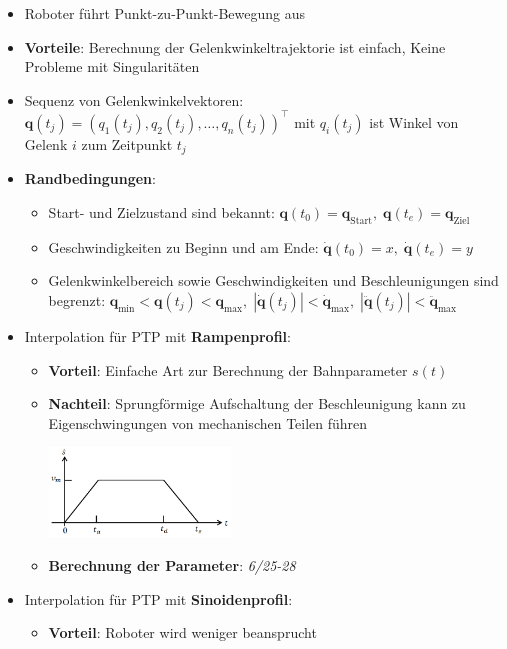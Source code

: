 \begin{itemize}
	\item Roboter führt Punkt-zu-Punkt-Bewegung aus
	\item \textbf{Vorteile}: Berechnung der Gelenkwinkeltrajektorie ist einfach, Keine Probleme mit Singularitäten
	\item Sequenz von Gelenkwinkelvektoren: $\mathbf{q}(t_j)=(q_1(t_j),q_2(t_j),\ldots, q_n(t_j))^\top$ mit $q_i(t_j)$ ist Winkel von Gelenk $i$ zum Zeitpunkt $t_j$
	\item \textbf{Randbedingungen}:
	\begin{itemize}
		\item Start- und Zielzustand sind bekannt: $\mathbf{q}(t_0)=\mathbf{q}_\text{Start},\; \mathbf{q}(t_e)=\mathbf{q}_\text{Ziel}$
		\item Geschwindigkeiten zu Beginn und am Ende: $\mathbf{\dot{q}}(t_0)=x, \; \mathbf{\dot{q}}(t_e)=y$
		\item Gelenkwinkelbereich sowie Geschwindigkeiten und Beschleunigungen sind begrenzt: $\mathbf{q}_\text{min} < \mathbf{q}(t_j)<\mathbf{q}_\text{max},\; |\mathbf{\dot{q}}(t_j)|<\mathbf{\dot{q}}_\text{max},\; |\mathbf{\ddot{q}}(t_j)|<\mathbf{\ddot{q}}_\text{max}$
	\end{itemize}
	\item Interpolation für PTP mit \textbf{Rampenprofil}:
	\begin{itemize}
		\item \textbf{Vorteil}: Einfache Art zur Berechnung der Bahnparameter $s(t)$
		\item \textbf{Nachteil}: Sprungförmige Aufschaltung der Beschleunigung kann zu Eigenschwingungen von mechanischen Teilen führen
		\begin{center}
			\includegraphics[width=0.4\textwidth]{images/rampenprofil.png}
		\end{center}
		\item \textbf{Berechnung der Parameter}: \textit{6/25-28}
	\end{itemize}
	\item Interpolation für PTP mit \textbf{Sinoidenprofil}:
	\begin{itemize}
		\item \textbf{Vorteil}: Roboter wird weniger beansprucht

\end{itemize}
\end{itemize}

